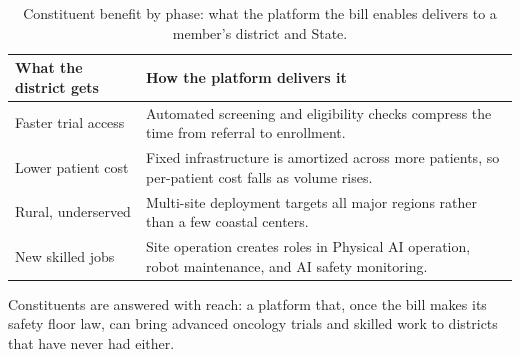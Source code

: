 \begin{table}[H]
\footnotesize
\begin{tabularx}{\textwidth}{@{}L{3.2cm} Y@{}}
\toprule
\textbf{What the district gets} & \textbf{How the platform delivers it}\\
\midrule
Faster trial access & Automated screening and eligibility checks compress the time from referral to enrollment.\\
Lower patient cost & Fixed infrastructure is amortized across more patients, so per-patient cost falls as volume rises.\\
Rural, underserved & Multi-site deployment targets all major regions rather than a few coastal centers.\\
New skilled jobs & Site operation creates roles in Physical AI operation, robot maintenance, and AI safety monitoring.\\
\bottomrule
\end{tabularx}
\caption{Constituent benefit by phase: what the platform the bill enables delivers to
a member's district and State.}
\label{tab:constituents}
\end{table}

\vspace{-0.5cm}

Constituents are answered with reach: a platform that, once the bill makes its safety
floor law, can bring advanced oncology trials and skilled work to districts that have
never had either.
